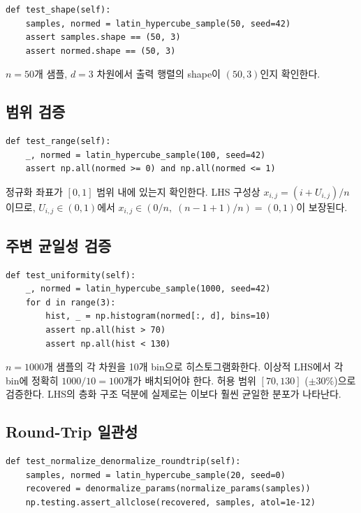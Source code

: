\documentclass[11pt]{article}
\begin{document}
\begin{lstlisting}
def test_shape(self):
    samples, normed = latin_hypercube_sample(50, seed=42)
    assert samples.shape == (50, 3)
    assert normed.shape == (50, 3)
\end{lstlisting}

$n = 50$개 샘플, $d = 3$ 차원에서 출력 행렬의 shape이 $(50, 3)$인지 확인한다.

\subsection{범위 검증}

\begin{lstlisting}
def test_range(self):
    _, normed = latin_hypercube_sample(100, seed=42)
    assert np.all(normed >= 0) and np.all(normed <= 1)
\end{lstlisting}

정규화 좌표가 $[0, 1]$ 범위 내에 있는지 확인한다.
LHS 구성상 $x_{i,j} = (i + U_{i,j})/n$이므로,
$U_{i,j} \in (0,1)$에서 $x_{i,j} \in (0/n,\; (n-1+1)/n) = (0, 1)$이 보장된다.

\subsection{주변 균일성 검증}

\begin{lstlisting}
def test_uniformity(self):
    _, normed = latin_hypercube_sample(1000, seed=42)
    for d in range(3):
        hist, _ = np.histogram(normed[:, d], bins=10)
        assert np.all(hist > 70)
        assert np.all(hist < 130)
\end{lstlisting}

$n = 1000$개 샘플의 각 차원을 10개 bin으로 히스토그램화한다.
이상적 LHS에서 각 bin에 정확히 $1000/10 = 100$개가 배치되어야 한다.
허용 범위 $[70, 130]$ ($\pm 30\%$)으로 검증한다.
LHS의 층화 구조 덕분에 실제로는 이보다 훨씬 균일한 분포가 나타난다.

\subsection{Round-Trip 일관성}

\begin{lstlisting}
def test_normalize_denormalize_roundtrip(self):
    samples, normed = latin_hypercube_sample(20, seed=0)
    recovered = denormalize_params(normalize_params(samples))
    np.testing.assert_allclose(recovered, samples, atol=1e-12)
\end{lstlisting}
\end{document}
